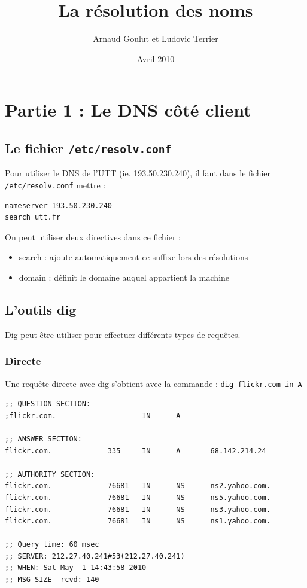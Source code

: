 \documentclass[12pt,a4paper,notitlepage]{article}
\begin{document}
\title{La résolution des noms}
\author{Arnaud Goulut et Ludovic Terrier}
\date{Avril 2010}
\maketitle



\thispagestyle{empty}




\section{Partie 1 : Le DNS côté client}

\subsection{Le fichier \texttt{/etc/resolv.conf}}
Pour utiliser le DNS de l'UTT (ie. 193.50.230.240), il faut dans le fichier \texttt{/etc/resolv.conf} mettre : \\

\begin{lstlisting}
nameserver 193.50.230.240
search utt.fr
\end{lstlisting}

\bigskip
On peut utiliser deux directives dans ce fichier :
\begin{itemize}
\item search : ajoute automatiquement ce suffixe lors des résolutions
\item domain : définit le domaine auquel appartient la machine
\end{itemize}


\subsection{L'outils dig}
Dig peut être utiliser pour effectuer différents types de requêtes.

\subsubsection{Directe}

Une requête directe avec dig s'obtient avec la commande : \texttt{dig flickr.com in A}\\
\begin{lstlisting}
;; QUESTION SECTION:
;flickr.com.                    IN      A

;; ANSWER SECTION:
flickr.com.             335     IN      A       68.142.214.24

;; AUTHORITY SECTION:
flickr.com.             76681   IN      NS      ns2.yahoo.com.
flickr.com.             76681   IN      NS      ns5.yahoo.com.
flickr.com.             76681   IN      NS      ns3.yahoo.com.
flickr.com.             76681   IN      NS      ns1.yahoo.com.

;; Query time: 60 msec
;; SERVER: 212.27.40.241#53(212.27.40.241)
;; WHEN: Sat May  1 14:43:58 2010
;; MSG SIZE  rcvd: 140
\end{lstlisting}
\end{document}
